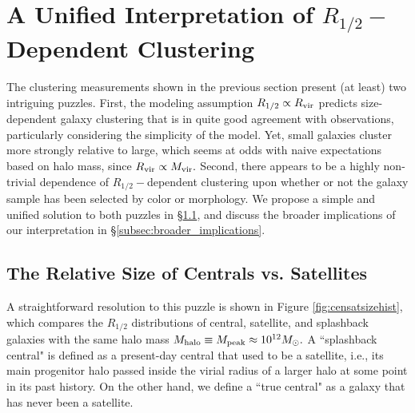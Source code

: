 \documentclass[usenatbib,usegraphicx,letterpaper]{mn2e}
\newcommand{\rhalf}{R_{1/2}}
\newcommand{\mvir}{M_{\rm vir}}
\newcommand{\mpeak}{M_{\rm peak}}
\newcommand{\mhalo}{M_{\rm halo}}
\newcommand{\rvir}{R_{\rm vir}}
\newcommand{\msun}{M_\odot}
\begin{document}
\section{A Unified Interpretation of $\rhalf-$Dependent Clustering}
\label{sec:interpretation}

The clustering measurements shown in the previous section present (at least) two intriguing puzzles. First, the modeling assumption $\rhalf\propto\rvir$ predicts size-dependent galaxy clustering that is in quite good agreement with observations, particularly considering the simplicity of the model. Yet, small galaxies cluster more strongly relative to large, which seems at odds with naive expectations based on halo mass, since $\rvir\propto\mvir.$ Second, there appears to be a highly non-trivial dependence of $\rhalf-$dependent clustering upon whether or not the galaxy sample has been selected by color or morphology. We propose a simple and unified solution to both puzzles in \S\ref{subsec:censat_sizes}, and discuss the broader implications of our interpretation in \S\ref{subsec:broader_implications}.

\subsection{The Relative Size of Centrals vs. Satellites}
\label{subsec:censat_sizes}


A straightforward resolution to this puzzle is shown in Figure \ref{fig:censatsizehist}, which compares the $\rhalf$ distributions of central, satellite, and splashback galaxies with the same halo mass $\mhalo\equiv\mpeak\approx10^{12}\msun.$ A ``splashback central"  is defined as a present-day central that used to be a satellite, i.e., its main progenitor halo passed inside the virial radius of a larger halo at some point in its past history. On the other hand, we define a ``true central" as a galaxy that has never been a satellite.
\end{document}
